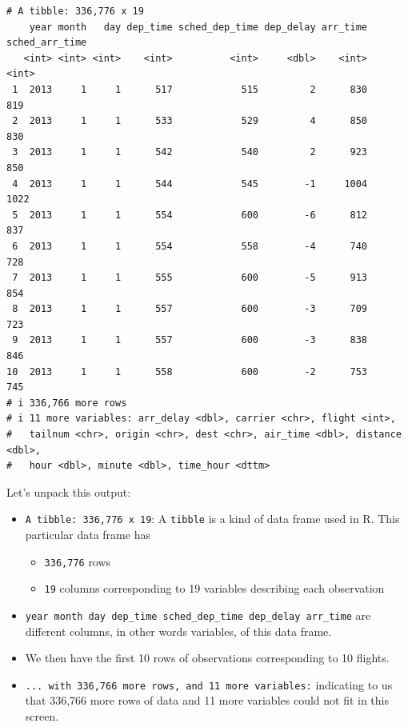 \documentclass[
  letterpaper,
  DIV=11,
  numbers=noendperiod]{scrreprt}
\providecommand{\tightlist}{%
  \setlength{\itemsep}{0pt}\setlength{\parskip}{0pt}}\usepackage{longtable,booktabs,array}
\theoremstyle{definition}
\theoremstyle{remark}
\begin{document}
\begin{verbatim}
# A tibble: 336,776 x 19
    year month   day dep_time sched_dep_time dep_delay arr_time sched_arr_time
   <int> <int> <int>    <int>          <int>     <dbl>    <int>          <int>
 1  2013     1     1      517            515         2      830            819
 2  2013     1     1      533            529         4      850            830
 3  2013     1     1      542            540         2      923            850
 4  2013     1     1      544            545        -1     1004           1022
 5  2013     1     1      554            600        -6      812            837
 6  2013     1     1      554            558        -4      740            728
 7  2013     1     1      555            600        -5      913            854
 8  2013     1     1      557            600        -3      709            723
 9  2013     1     1      557            600        -3      838            846
10  2013     1     1      558            600        -2      753            745
# i 336,766 more rows
# i 11 more variables: arr_delay <dbl>, carrier <chr>, flight <int>,
#   tailnum <chr>, origin <chr>, dest <chr>, air_time <dbl>, distance <dbl>,
#   hour <dbl>, minute <dbl>, time_hour <dttm>
\end{verbatim}

Let's unpack this output:

\begin{itemize}
\item
  \texttt{A\ tibble:\ 336,776\ x\ 19}: A \texttt{tibble} is a kind of
  data frame used in R. This particular data frame has

  \begin{itemize}
  \tightlist
  \item
    \texttt{336,776} rows
  \item
    \texttt{19} columns corresponding to 19 variables describing each
    observation
  \end{itemize}
\item
  \texttt{year\ month\ day\ dep\_time\ sched\_dep\_time\ dep\_delay\ arr\_time}
  are different columns, in other words variables, of this data frame.
\item
  We then have the first 10 rows of observations corresponding to 10
  flights.
\item
  \texttt{...\ with\ 336,766\ more\ rows,\ and\ 11\ more\ variables:}
  indicating to us that 336,766 more rows of data and 11 more variables
  could not fit in this screen.
\end{itemize}
\end{document}
